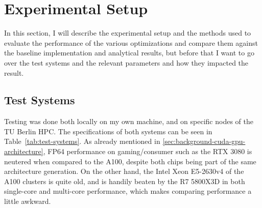 \section{Experimental Setup}
\label{sec:evaluation-experimental-setup}

In this section, I will describe the experimental setup and the methods used to evaluate the performance of the various optimizations and compare them against the baseline implementation and analytical results, but before that I want to go over the test systems and the relevant parameters and how they impacted the result.

\subsection{Test Systems}
\label{sec:evaluation-experimental-setup-test-systems}

Testing was done both locally on my own machine, and on specific nodes of the TU Berlin HPC. 
The specifications of both systems can be seen in Table~\ref{tab:test-systems}. 
As already mentioned in \ref{sec:background-cuda-gpu-architecture}, FP64 performance on gaming/consumer such as the RTX 3080 is neutered when compared to the A100, despite both chips being part of the same architecture generation.
On the other hand, the Intel Xeon E5-2630v4 of the A100 clusters is quite old, and is handily beaten by the R7 5800X3D in both single-core and multi-core performance, which makes comparing performance a little awkward.

\begin{table}[htbp]
    \centering
    \caption{Specifications of the systems used for testing.}
    \label{tab:test-systems}
\end{table}

